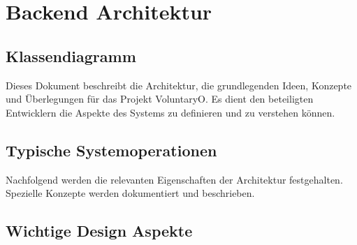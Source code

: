 \chapter{Backend Architektur}
	\section{Klassendiagramm}
	Dieses Dokument beschreibt die Architektur, die grundlegenden Ideen, Konzepte und Überlegungen für das Projekt VoluntaryO. Es dient den beteiligten Entwicklern die Aspekte des Systems zu definieren und zu verstehen können.
	
	
	\section{Typische Systemoperationen}
	Nachfolgend werden die relevanten Eigenschaften der Architektur festgehalten. Spezielle Konzepte werden dokumentiert und beschrieben.

	\section{Wichtige Design Aspekte}